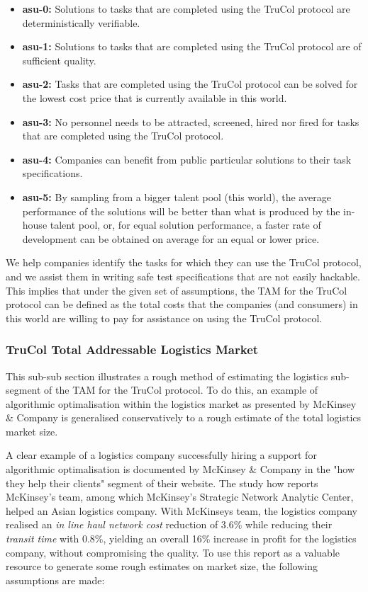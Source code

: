 \begin{itemize}
	\item \textbf{asu-0:} Solutions to tasks that are completed using the TruCol protocol are deterministically verifiable.
	\item \textbf{asu-1:} Solutions to tasks that are completed using the TruCol protocol are of sufficient quality.
	\item \textbf{asu-2:} Tasks that are completed using the TruCol protocol can be solved for the lowest cost price that is currently available in this world.
	\item \textbf{asu-3:} No personnel needs to be attracted, screened, hired nor fired for tasks that are completed using the TruCol protocol.
	\item \textbf{asu-4:} Companies can benefit from public particular solutions to their task specifications.
	\item \textbf{asu-5:} By sampling from a bigger talent pool (this world), the average performance of the solutions will be better than what is produced by the in-house talent pool, or, for equal solution performance, a faster rate of development can be obtained on average for an equal or lower price.
\end{itemize}



We help companies identify the tasks for which they can use the TruCol protocol, and we assist them in writing safe test specifications that are not easily hackable. This implies that under the given set of assumptions, the TAM for the TruCol protocol can be defined as the total costs that the companies (and consumers) in this world are willing to pay for assistance on using the TruCol protocol.

\subsubsection{TruCol Total Addressable Logistics Market}\label{subsubsec:tam_logistics}

This sub-sub section illustrates a rough method of estimating the logistics sub-segment of the TAM for the TruCol protocol. To do this, an example of algorithmic optimalisation within the logistics market as presented by McKinsey \& Company is generalised conservatively to a rough estimate of the total logistics market size.

A clear example of a logistics company successfully hiring a support for algorithmic optimalisation is documented by McKinsey \& Company in the "how they help their clients" segment of their website\cite{mckinsey_algo}. The study how reports McKinsey's team, among which McKinsey's Strategic Network Analytic Center, helped an Asian logistics company. With McKinseys team, the logistics company realised an \textit{in line haul network cost} reduction of 3.6\% while reducing their \textit{transit time} with 0.8\%, yielding an overall 16\% increase in profit for the logistics company, without compromising the quality. To use this report as a valuable resource to generate some rough estimates on market size, the following assumptions are made:

